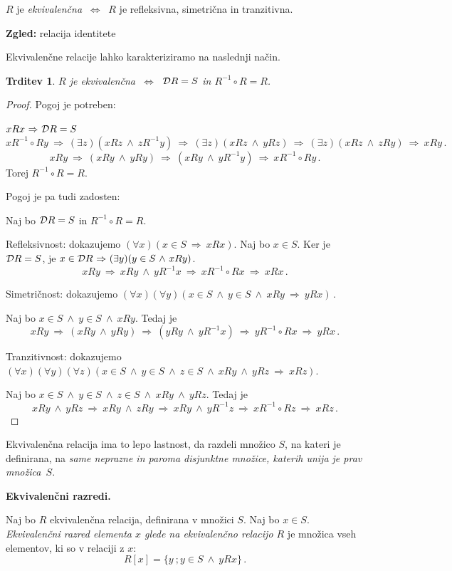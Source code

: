 \documentclass[11pt,paper=b5,DIV=13,headinclude,footinclude]{scrbook}
\def\inn {{~\wedge~}}
\def\sledi {{~\Rightarrow~}}
\def\cee {{~\Leftrightarrow~}}
\newtheorem*{trditev}{Trditev}
\begin{document}
$R$ je {\em ekvivalenčna} $\cee$ $R$ je refleksivna, simetrična in tranzitivna.

\textbf{ Zgled:} relacija identitete

\bigskip
Ekvivalenčne relacije lahko karakteriziramo na naslednji način.

\begin{trditev}
$R$ je ekvivalenčna $\cee$ ${\cal D}R = S$ in $R^{-1}\circ R = R$.
\end{trditev}

\begin{proof}
Pogoj je potreben:

$xRx \sledi {\cal D}R = S$
$$xR^{-1}\circ Ry \sledi (\exists z)(xRz \inn zR^{-1}y)
\sledi (\exists z)(xRz \inn yRz)
\sledi (\exists z)(xRz \inn zRy)
\sledi xRy\,.$$
$$xRy
\sledi (xRy\inn yRy)
\sledi (xRy\inn yR^{-1}y)
\sledi xR^{-1}\circ Ry\,.$$
Torej $R^{-1}\circ R = R$.

Pogoj je pa tudi zadosten:

Naj bo ${\cal D}R = S$ in $R^{-1}\circ R = R$.

Refleksivnost: dokazujemo $(\forall x)(x\in S\sledi xRx)$.
Naj bo $x\in S$. Ker je ${\cal D}R = S$,
je $x\in {\cal D}R\sledi (\exists y)(y\in S\inn xRy)$.
$$xRy
\sledi xRy\inn yR^{-1}x
\sledi x R^{-1}\circ R x
\sledi xRx\,.$$

Simetričnost: dokazujemo $(\forall x)(\forall y)(x\in S\inn y\in S\inn xRy\sledi yRx)\,.$

Naj bo $x\in S\inn y\in S\inn xRy$.
Tedaj je
$$xRy \sledi (xRy\inn yRy)
\sledi (yRy\inn yR^{-1}x)
\sledi yR^{-1}\circ Rx
\sledi yRx\,.$$

Tranzitivnost: dokazujemo $(\forall x)(\forall y)(\forall z)(x\in S\inn y\in S\inn z\in S\inn xRy\inn yRz\sledi xRz).$

Naj bo $x\in S\inn y\in S\inn z\in S\inn xRy\inn yRz$.
Tedaj je
$$xRy \inn yRz \sledi xRy\inn zRy
\sledi xRy\inn yR^{-1}z
\sledi xR^{-1}\circ Rz
\sledi xRz\,.$$
\end{proof}

\medskip
Ekvivalenčna relacija ima to lepo lastnost, da razdeli množico $S$, na kateri je definirana, na {\em same neprazne in paroma disjunktne množice, katerih unija
je prav množica~$S$}.

\medskip
\textbf{ Ekvivalenčni razredi.}

Naj bo $R$ ekvivalenčna relacija, definirana v množici $S$. Naj bo $x\in S$. {\em Ekvivalenčni razred elementa $x$ glede na ekvivalenčno relacijo $R$} je množica vseh elementov, ki so v relaciji z $x$:
$$R[x] = \{y~;y\in S \inn yRx\}\,.$$
\end{document}
